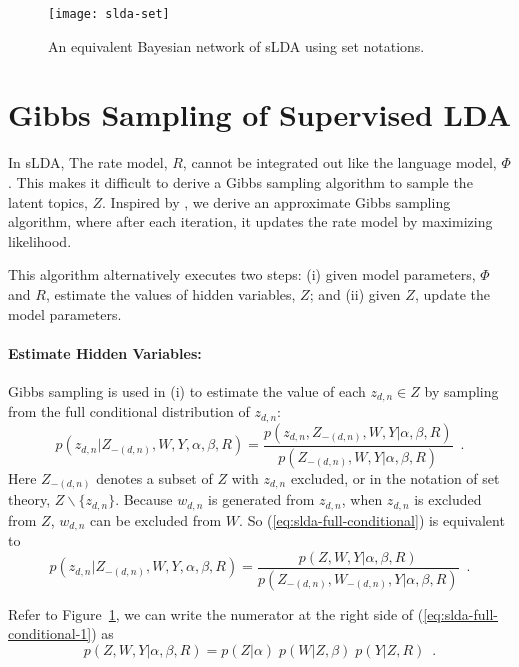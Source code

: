 \begin{figure}[!t]
  \centering
  \texttt{[image: slda-set]}
  \caption{An equivalent Bayesian network of sLDA using set notations.}
  \label{fig:slda-set}
\end{figure}

\section{Gibbs Sampling of Supervised LDA}

In sLDA, The rate model, $R$, cannot be integrated out like the
language model, $\Phi$.  This makes it difficult to derive a Gibbs
sampling algorithm to sample the latent topics, $Z$.  Inspired by
\cite{tot}, we derive an approximate Gibbs sampling algorithm, where
after each iteration, it updates the rate model by maximizing
likelihood.

This algorithm alternatively executes two steps: (i) given model
parameters, $\Phi$ and $R$, estimate the values of hidden variables,
$Z$; and (ii) given $Z$, update the model parameters.

\paragraph{Estimate Hidden Variables:} Gibbs sampling is used in
(i) to estimate the value of each $z_{d,n}\in{}Z$ by sampling from the
full conditional distribution of $z_{d,n}$:
\begin{equation}
  \label{eq:slda-full-conditional}
  p(z_{d,n}|Z_{-(d,n)},W,Y,\alpha,\beta,R)
  =
  \frac{
    p(z_{d,n},Z_{-(d,n)},W,Y|\alpha,\beta,R)
  }{
    p(Z_{-(d,n)},W,Y|\alpha,\beta,R)
  }
  \enspace.
\end{equation}
Here $Z_{-(d,n)}$ denotes a subset of $Z$ with $z_{d,n}$ excluded, or
in the notation of set theory, $Z\backslash\{z_{d,n}\}$.  Because
$w_{d,n}$ is generated from $z_{d,n}$, when $z_{d,n}$ is excluded from
$Z$, $w_{d,n}$ can be excluded from $W$.  So
(\ref{eq:slda-full-conditional}) is equivalent to
\begin{equation}
  \label{eq:slda-full-conditional-1}
  p(z_{d,n}|Z_{-(d,n)},W,Y,\alpha,\beta,R)
  =
  \frac{
    p(Z,W,Y|\alpha,\beta,R)
  }{
    p(Z_{-(d,n)},W_{-(d,n)},Y|\alpha,\beta,R)
  }
  \enspace.
\end{equation}

Refer to Figure~\ref{fig:slda-set}, we can write the numerator at the
right side of (\ref{eq:slda-full-conditional-1}) as
\begin{equation}
  \label{eq:slda-joint-distribution}
  p(Z,W,Y|\alpha,\beta,R) =
  p(Z|\alpha) \; p(W|Z,\beta) \; p(Y|Z,R)
  \enspace.
\end{equation}

